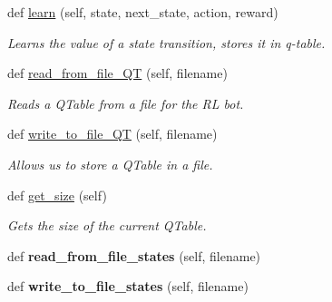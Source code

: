 \begin{DoxyCompactItemize}
def \hyperlink{classRLBrain_1_1RLBrain_acfa575d5f9331948ca20f9ccbf408886}{learn} (self, state, next\+\_\+state, action, reward)
\begin{DoxyCompactList}\small\item\em Learns the value of a state transition, stores it in q-\/table. \end{DoxyCompactList}\item 
def \hyperlink{classRLBrain_1_1RLBrain_a32246b81b1fef3ea2ae090b234c3b4f3}{read\+\_\+from\+\_\+file\+\_\+\+QT} (self, filename)
\begin{DoxyCompactList}\small\item\em Reads a Q\+Table from a file for the RL bot. \end{DoxyCompactList}\item 
def \hyperlink{classRLBrain_1_1RLBrain_a250a60c697c0748a12ac58eebaee6f7d}{write\+\_\+to\+\_\+file\+\_\+\+QT} (self, filename)
\begin{DoxyCompactList}\small\item\em Allows us to store a Q\+Table in a file. \end{DoxyCompactList}\item 
def \hyperlink{classRLBrain_1_1RLBrain_a007381445651792bf63a1d7b80c4a7f2}{get\+\_\+size} (self)
\begin{DoxyCompactList}\small\item\em Gets the size of the current Q\+Table. \end{DoxyCompactList}\item 
def {\bfseries read\+\_\+from\+\_\+file\+\_\+states} (self, filename)\hypertarget{classRLBrain_1_1RLBrain_a58ffb2733e58bba78ad1bdc47a7566cb}{}\label{classRLBrain_1_1RLBrain_a58ffb2733e58bba78ad1bdc47a7566cb}

\item 
def {\bfseries write\+\_\+to\+\_\+file\+\_\+states} (self, filename)\hypertarget{classRLBrain_1_1RLBrain_a0a32317798997801933b51fa11e8678b}{}\label{classRLBrain_1_1RLBrain_a0a32317798997801933b51fa11e8678b}

\end{DoxyCompactItemize}
